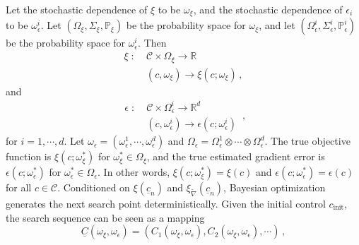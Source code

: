 Let the stochastic dependence of $\xi$ to be $\omega_\xi$, and the stochastic dependence of 
$\epsilon_i$ to be $\omega_\epsilon^i$.
Let $(\Omega_\xi, \Sigma_\xi, \mathbb{P}_\xi)$ be the probability space for $\omega_\xi$, and let
 $(\Omega_\epsilon^i, \Sigma_\epsilon^i, \mathbb{P}_\epsilon^i)$ be the probability space for $\omega_\epsilon^i$. Then
\begin{equation}\begin{split}
    \xi\; : \; & \mathcal{C} \times \Omega_\xi \rightarrow \mathbb{R}\\
               & (c, \omega_\xi) \rightarrow \xi(c; \omega_\xi)\,,
\end{split}\end{equation}
and
\begin{equation}\left.\begin{split}
    \epsilon \; :\; & \mathcal{C} \times \Omega_\epsilon^i \rightarrow \mathbb{R}^d \\
                    & (c, \omega_\epsilon^i) \rightarrow \epsilon(c; \omega_\epsilon^i)
\end{split}\right.\,,
\end{equation}
for $i=1,\cdots, d$.
Let $\omega_\epsilon=(\omega_\epsilon^1,\cdots, \omega_\epsilon^d)$ and $\Omega_\epsilon =\Omega_\epsilon^1\otimes \cdots
\otimes \Omega_\epsilon^d$.
The true objective function is $\xi(c; \omega_\xi^*)$ for $\omega_\xi^*\in \Omega_\xi$, and
the true estimated gradient error is $\epsilon(c;\omega_\epsilon^*)$ for $\omega_\epsilon^* \in \Omega_\epsilon$.
In other words, $\xi(c;\omega_\xi^*) = \xi(c)$ and $\epsilon(c;\omega_\epsilon^*)=\epsilon(c)$ for all
$c\in \mathcal{C}$.
Conditioned on $\xi(\underline{c}_n)$ and $\xi_{\tilde{\nabla}}(\underline{c}_n)$, 
Bayesian optimization generates the next search point deterministically.
Given the initial control $c_{\textrm{init}}$, the search sequence can be seen as a mapping
\begin{equation}
     \underline{C}(\omega_\xi, \omega_\epsilon) = \left(C_1(\omega_\xi, \omega_\epsilon),
     C_2(\omega_\xi, \omega_\epsilon), \cdots\right)\,,
\end{equation}
